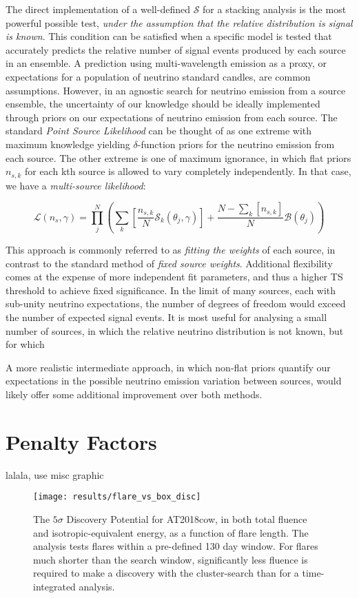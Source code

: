 The direct implementation of a well-defined $\mathcal{S}$ for a stacking analysis is the most powerful possible test, \emph{under the assumption that the relative distribution is signal is known}. This condition can be satisfied when a specific model is tested that accurately predicts the relative number of signal events produced by each source in an ensemble. A prediction using multi-wavelength emission as a proxy, or expectations for a population of neutrino standard candles, are common assumptions. However, in an agnostic search for neutrino emission from a source ensemble, the uncertainty of our knowledge should be ideally implemented through priors on our expectations of neutrino emission from each source. The standard \emph{Point Source Likelihood} can be thought of as one extreme with maximum knowledge yielding $\delta$-function priors for the neutrino emission from each source. The other extreme is one of maximum ignorance, in which flat priors $n_{s, k}$ for each kth source is allowed to vary completely independently. In that case, we have a \emph{multi-source likelihood}:

\[ \mathcal{L}(n_{s}, \gamma) = \prod_{j}^{N} \left(\sum_{k} \left[ \frac{n_{s, k}}{N} \mathcal{S}_{k}(\theta_{j}, \gamma) \right]+ \frac{N - \sum_{k} \left[ n_{s, k} \right] }{N} \mathcal{B}(\theta_{j})  \right)\]

This approach is commonly referred to as \emph{fitting the weights} of each source, in contrast to the standard method of \emph{fixed source weights}. Additional flexibility comes at the expense of more independent fit parameters, and thus a higher TS threshold to achieve fixed significance. In the limit of many sources, each with sub-unity neutrino expectations, the number of degrees of freedom would exceed the number of expected signal events. It is most useful for analysing a small number of sources, in which the relative neutrino distribution is not known, but for which 

A more realistic intermediate approach, in which non-flat priors quantify our expectations in the possible neutrino emission variation between sources, would likely offer some additional improvement over both methods. 

\section{Penalty Factors}
lalala, use misc graphic

\begin{figure}[!ht]
	\centering \texttt{[image: results/flare\_vs\_box\_disc]}
	\caption{The $5\sigma$ Discovery Potential for AT2018cow, in both total fluence and isotropic-equivalent energy, as a function of flare length. The analysis tests flares within a pre-defined 130 day window. For flares much shorter than the search window, significantly less fluence is required to make a discovery with the cluster-search than for a time-integrated analysis.}
	\label{fig:DiscTime}
\end{figure}

